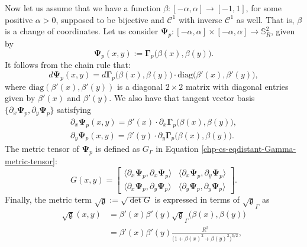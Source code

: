 Now let us assume that we have a function $\beta:[-\alpha,\alpha] \to [-1,1]$, for some positive $\alpha>0$,
supposed to be bijective and $\mathcal{C}^1$ with inverse $\mathcal{C}^1$ as well.
That is, $\beta$ is a change of coordinates.
Let us consider $ \boldsymbol{\Psi}_p: [-\alpha,\alpha]\times [-\alpha,\alpha] \to \mathbb{S}^2_R$,
given by 
\begin{equation*}
	\boldsymbol{\Psi}_p(x,y) := \boldsymbol{\Gamma}_p\big(\beta(x),\beta(y)\big).
\end{equation*}
It follows from the chain rule that:
\begin{equation*}
        d \boldsymbol{\Psi}_p(x,y) = d \boldsymbol{\Gamma}_p\big(\beta(x),\beta(y)\big)\cdot\text{diag}\big(\beta'(x),\beta'(y)\big),
\end{equation*}
where $\text{diag}(\beta'(x),\beta'(y))$ is a diagonal $2\times 2$ matrix with diagonal entries given by $\beta'(x)$ and $\beta'(y)$.
We also have that tangent vector basis $\{{\partial_x  \boldsymbol{\Psi}_p},  {\partial_y  \boldsymbol{\Psi}_p}\}$ satisfying
\begin{align*}
	{\partial_x  \boldsymbol{\Psi}_p}(x,y) = \beta'(x) \cdot {\partial_x  \boldsymbol{\Gamma}_p}\big(\beta(x),\beta(y)\big),\\
	{\partial_y  \boldsymbol{\Psi}_p}(x,y) = \beta'(y) \cdot {\partial_y  \boldsymbol{\Gamma}_p}\big(\beta(x),\beta(y)\big).
\end{align*}
The metric tensor of $\boldsymbol{\Psi}_p$ is defined as $G_{\Gamma}$ in Equation \eqref{chp-cs-eqdistant-Gamma-metric-tensor}:
\begin{equation*}
	\label{chp-cs-eqdistant-Psi-metric-tensor}
	G(x,y) = 
	\begin{bmatrix}
		\langle  {\partial_x  \boldsymbol{\Psi}_p}, {\partial_x \boldsymbol{\Psi}_p} \rangle & 
		\langle  {\partial_x  \boldsymbol{\Psi}_p}, {\partial_y \boldsymbol{\Psi}_p} \rangle \\
		\langle  {\partial_x  \boldsymbol{\Psi}_p}, {\partial_y \boldsymbol{\Psi}_p} \rangle  &
		\langle  {\partial_y  \boldsymbol{\Psi}_p}, {\partial_y \boldsymbol{\Psi}_p} \rangle 
	\end{bmatrix}.
\end{equation*}
Finally, the metric term $\sqrt{\mathfrak{g}}:= \sqrt{\det{G}}$ is expressed in terms of $\sqrt{\mathfrak{g}}_{\Gamma}$ as
\begin{align*}
    \sqrt{\mathfrak{g}}(x,y) &= \beta'(x)\beta'(y)\sqrt{\mathfrak{g}}_{\Gamma}\big(\beta(x),\beta(y)\big)\\
    &= \beta'(x)\beta'(y)\frac{R^2}{\big(1+\beta(x)^2+\beta(y)^2\big)^{3/2}},
\end{align*}
